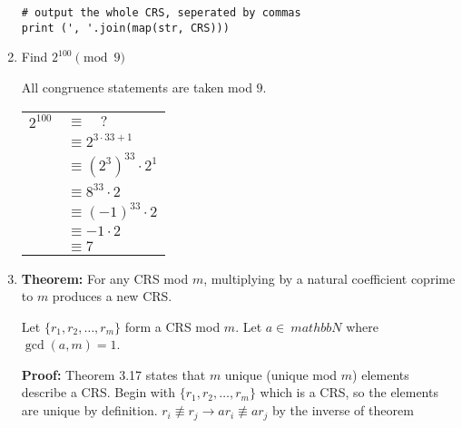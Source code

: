 \documentclass[12pt,letterpaper]{article}
\begin{document}
\begin{enumerate}[leftmargin=0mm]
\begin{verbatim}
# output the whole CRS, seperated by commas
print (', '.join(map(str, CRS)))
\end{verbatim}

\item Find \(2^{100} \pmod 9\)

All congruence statements are taken mod \(9\).

\begin{tabular}[t]{l l}
\(2^{100}\) & \(\equiv \quad ?\)\\
& \(\equiv 2^{3 \cdot 33 + 1}\) \\
& \(\equiv (2^3)^{33} \cdot 2^1\) \\
& \(\equiv 8^{33} \cdot 2 \) \\
& \(\equiv (-1)^{33} \cdot 2\) \\
& \(\equiv -1 \cdot 2\) \\
& \(\equiv 7\) \\
\end{tabular}

\item \textbf{Theorem:} For any CRS mod \(m\), multiplying by a natural coefficient coprime to \(m\) produces a new CRS.

Let \(\{r_1, r_2, \dots, r_m\}\) form a CRS mod \(m\). Let \(a \in\ mathbb N\) where \(\gcd(a, m) = 1\).

\textbf{Proof:} Theorem 3.17 states that \(m\) unique (unique mod \(m\)) elements describe a CRS. Begin with \(\{r_1, r_2, \dots, r_m\}\) which is a CRS, so the elements are unique by definition. \(r_i \not\equiv r_j \rightarrow a r_i \not\equiv a r_j\) by the inverse of theorem 


\end{enumerate}
\end{document}
